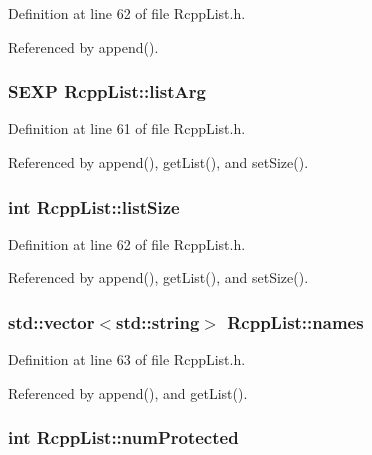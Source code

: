 Definition at line 62 of file RcppList.h.

Referenced by append().\hypertarget{classRcppList_abaa6e138e2c0153c8d95d7d7669e7330}{
\subsubsection[{listArg}]{\setlength{\rightskip}{0pt plus 5cm}SEXP {\bf RcppList::listArg}}}
\label{classRcppList_abaa6e138e2c0153c8d95d7d7669e7330}


Definition at line 61 of file RcppList.h.

Referenced by append(), getList(), and setSize().\hypertarget{classRcppList_a05ddf3e17ed3d9aebca235fccf15d383}{
\subsubsection[{listSize}]{\setlength{\rightskip}{0pt plus 5cm}int {\bf RcppList::listSize}}}
\label{classRcppList_a05ddf3e17ed3d9aebca235fccf15d383}


Definition at line 62 of file RcppList.h.

Referenced by append(), getList(), and setSize().\hypertarget{classRcppList_ad718b4509024d31cc7e894518ce909dd}{
\subsubsection[{names}]{\setlength{\rightskip}{0pt plus 5cm}std::vector$<$std::string$>$ {\bf RcppList::names}}}
\label{classRcppList_ad718b4509024d31cc7e894518ce909dd}


Definition at line 63 of file RcppList.h.

Referenced by append(), and getList().\hypertarget{classRcppList_a58644ce3af78cc421f04bafc3cc559b4}{
\subsubsection[{numProtected}]{\setlength{\rightskip}{0pt plus 5cm}int {\bf RcppList::numProtected}}}
\label{classRcppList_a58644ce3af78cc421f04bafc3cc559b4}


